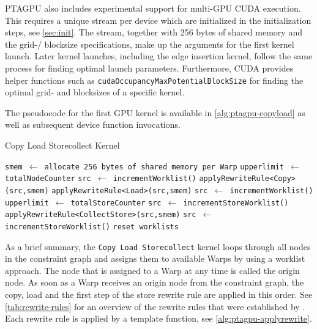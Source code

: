 PTAGPU also includes experimental support for multi-GPU CUDA execution. This requires a unique stream per device which are initialized in the initialization steps, see \autoref{sec:init}.
The stream, together with 256 bytes of shared memory and the grid-/ blocksize specifications, make up the arguments for the first kernel launch. Later kernel launches, including the edge insertion kernel, follow the same process for finding optimal launch parameters. Furthermore, CUDA provides helper functions such as \verb|cudaOccupancyMaxPotentialBlockSize| for finding the optimal grid- and blocksizes of a specific kernel.

The pseudocode for the first GPU kernel is available in \autoref{alg:ptagpu-copyload} as well as subsequent device function invocations.
\begin{algorithm}
    \caption{Copy Load Storecollect Kernel}\label{alg:ptagpu-copyload}
    \begin{algorithmic}
        \State \texttt{smem $\leftarrow$ allocate 256 bytes of shared memory per Warp}
        \State \texttt{upperlimit $\leftarrow$ totalNodeCounter}
        \State \texttt{src $\leftarrow$ incrementWorklist()}
        \State \texttt{applyRewriteRule<Copy>(src,smem)} 
        \State \texttt{applyRewriteRule<Load>(src,smem)}
        \State \texttt{src $\leftarrow$ incrementWorklist()}
        \EndWhile
        \State \texttt{upperlimit $\leftarrow$ totalStoreCounter}
        \State \texttt{src $\leftarrow$ incrementStoreWorklist()}
        \State \texttt{applyRewriteRule<CollectStore>(src,smem)} 
        \State \texttt{src $\leftarrow$ incrementStoreWorklist()}
        \EndWhile
        \State \texttt{reset worklists}
    \end{algorithmic}
\end{algorithm}
As a brief summary, the \verb|Copy Load Storecollect| kernel loops through all nodes in the constraint graph and assigns them to available Warps by using a worklist approach.
The node that is assigned to a Warp at any time is called the origin node.
As soon as a Warp receives an origin node from the constraint graph, the copy, load and the first step of the store rewrite rule are applied in this order. See \autoref{tab:rewrite-rules} for an overview of the rewrite rules that were established by \cite{mendez2012gpu}.
Each rewrite rule is applied by a template function, see \autoref{alg:ptagpu-applyrewrite}.
